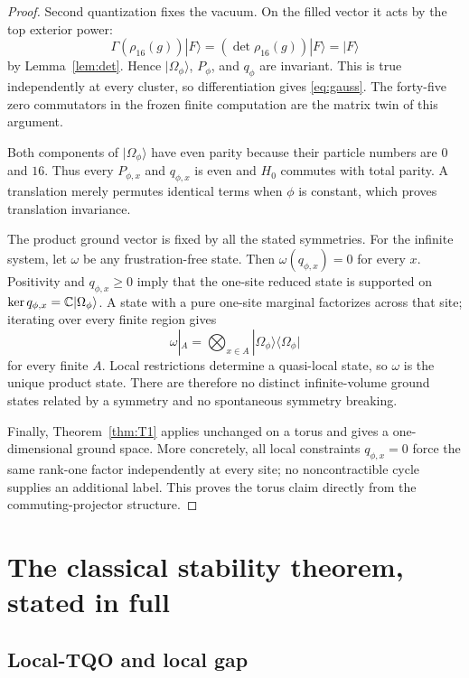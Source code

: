 \begin{proof}
Second quantization fixes the vacuum.  On the filled vector it acts by
the top exterior power:
\[
 \Gamma(\rho_{16}(g))|F\rangle
 =(\det\rho_{16}(g))|F\rangle=|F\rangle
\]
by Lemma~\ref{lem:det}.  Hence $|\Omega_\phi\rangle$, $P_\phi$, and
$q_\phi$ are invariant.  This is true independently at every cluster,
so differentiation gives \eqref{eq:gauss}.  The forty-five zero
commutators in the frozen finite computation are the matrix twin of
this argument.

Both components of $|\Omega_\phi\rangle$ have even parity because
their particle numbers are $0$ and $16$.  Thus every $P_{\phi,x}$ and
$q_{\phi,x}$ is even and $H_0$ commutes with total parity.  A
translation merely permutes identical terms when $\phi$ is constant,
which proves translation invariance.

The product ground vector is fixed by all the stated symmetries.  For
the infinite system, let $\omega$ be any frustration-free state.
Then $\omega(q_{\phi,x})=0$ for every $x$.  Positivity and
$q_{\phi,x}\geq0$ imply that the one-site reduced state is supported
on $\ker q_{\phi,x}=\mathbb C|\Omega_\phi\rangle$.  A state with a pure
one-site marginal factorizes across that site; iterating over every
finite region gives
\[
 \omega|_A
 =\bigotimes_{x\in A}
 |\Omega_\phi\rangle\langle\Omega_\phi|
\]
for every finite $A$.  Local restrictions determine a quasi-local
state, so $\omega$ is the unique product state.  There are therefore
no distinct infinite-volume ground states related by a symmetry and
no spontaneous symmetry breaking.

Finally, Theorem~\ref{thm:T1} applies unchanged on a torus and gives a
one-dimensional ground space.  More concretely, all local constraints
$q_{\phi,x}=0$ force the same rank-one factor independently at every
site; no noncontractible cycle supplies an additional label.  This
proves the torus claim directly from the commuting-projector
structure.
\end{proof}

\section{The classical stability theorem, stated in full}

\subsection{Local-TQO and local gap}


